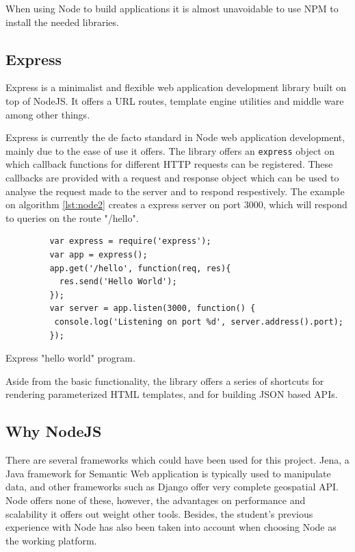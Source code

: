 When using Node to build applications it is almost unavoidable to use NPM to install the needed libraries.

\subsection*{Express}

Express is a minimalist and flexible web application development library built on top of NodeJS. It offers a URL routes, template engine utilities and middle ware among other things. 

Express is currently the de facto standard in Node web application development, mainly due to the ease of use it offers. The library offers an \texttt{express} object on which callback functions for different HTTP requests can be registered. These callbacks are provided with a request and response object which can be used to analyse the request made to the server and to respond respestively. The example on algorithm \ref{lst:node2} creates a express server on port 3000, which will respond to queries on the route "/hello".

\begin{listing}\centering
  \begin{minipage}{.6\textwidth}
    \begin{verbatim}
	     var express = require('express');
	     var app = express();
	     app.get('/hello', function(req, res){
	       res.send('Hello World');
	     });
	     var server = app.listen(3000, function() {
	      console.log('Listening on port %d', server.address().port);
	     });
    \end{verbatim}
  \end{minipage}
  \caption{Express "hello world" program.}\label{lst:node2}
\end{listing}

Aside from the basic functionality, the library offers a series of shortcuts for rendering parameterized HTML templates, and for building JSON based APIs.

\subsection*{Why NodeJS}

There are several frameworks which could have been used for this project. Jena, a Java framework for Semantic Web application is typically used to manipulate data, and other frameworks such as Django offer very complete geospatial API. Node offers none of these, however, the advantages on performance and scalability it offers out weight other tools. Besides, the student's previous experience with Node has also been taken into account when choosing Node as the working platform.
 
